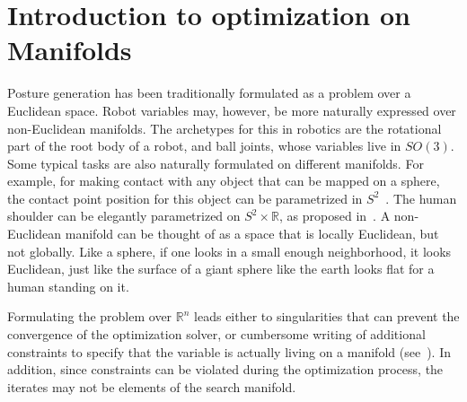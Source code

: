 
\section{Introduction to optimization on Manifolds}
\label{sec:introduction_to_optimization_on_manifolds}

Posture generation has been traditionally formulated as a problem over a Euclidean space.
Robot variables may, however, be more naturally expressed over non-Euclidean manifolds.
The archetypes for this in robotics are the rotational part of the root body of a robot, and ball joints, whose variables live in $SO(3)$.
Some typical tasks are also naturally formulated on different manifolds.
For example, for making contact with any object that can be mapped on a sphere, the contact point position for this object can be parametrized in $S^2$~\cite{escande:icra:2016}.
The human shoulder can be elegantly parametrized on $S^2\times\mathbb{R}$, as proposed in~\cite{baerlocher}.
A non-Euclidean manifold can be thought of as a space that is locally Euclidean, but not globally.
Like a sphere, if one looks in a small enough neighborhood, it looks Euclidean, just like the surface of a giant sphere like the earth looks flat for a human standing on it.

Formulating the problem over $\mathbb{R}^n$ leads either to singularities that can prevent the convergence of the optimization solver, or cumbersome writing of additional constraints to specify that the variable is actually living on a manifold (see~\cite{bouyarmane:humanoids:2012}).
In addition, since constraints can be violated during the optimization process, the iterates may not be elements of the search manifold.

